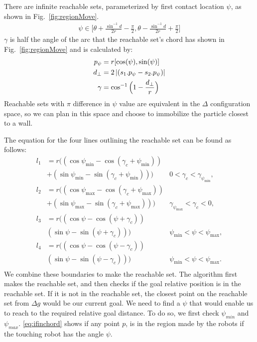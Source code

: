There are infinite reachable sets, parameterized by first contact location $\psi$, as shown in Fig.~\ref{fig:regionMove}.
\begin{align}
 \psi \in \Big[\theta +\frac{\sin^{-1}{d}}{2r} - \frac{\pi}{2}, \theta -\frac{\sin^{-1}{d}}{2r} + \frac{\pi}{2}\Big]
\end{align}
$\gamma$ is half the angle of the arc that the reachable set's chord has shown in Fig.~\ref{fig:regionMove} and is calculated by:
\begin{align}
p_\psi &= r[\cos(\psi ), \sin(\psi )]\\
d_\perp&= 2 \left\lvert(s_1.p_\psi - s_2.p_\psi)\right\rvert\\
\gamma &= \cos^{-1} \Big(1-\frac{d_\perp}{r} \Big)
\end{align}
Reachable sets with $\pi$ difference in $\psi$ value are equivalent in the  $\Delta$ configuration space, so we can plan in this space and choose to immobilize the particle closest to a wall. 

The equation for the four lines outlining the reachable set can be found as follows:
\begin{align}\label{eq:circlereachable}
l_1 &=  r \Big((\cos\psi_{\min}- \cos(\gamma_c + \psi_{\min}) )\\ \nonumber
& + (\sin\psi_{\min}- \sin(\gamma_c + \psi_{\min}))\Big) &  0<\gamma_c< \gamma_{\psi_{\min}},\\ \nonumber
l_2 &=  r \Big((\cos\psi_{\max}- \cos(\gamma_c + \psi_{\max}))\\ \nonumber
& + (\sin\psi_{\max}- \sin(\gamma_c + \psi_{\max}))\Big) &  \gamma_{\psi_{\max}}<\gamma_c< 0,\\  \nonumber
l_3 &=  r \Big((\cos\psi- \cos( \psi+\gamma_c ) )\\ \nonumber
& ( \sin\psi-\sin( \psi+ \gamma_c))\Big) &  \psi_{\min}<\psi< \psi_{\max},\\ \nonumber
l_4 &=  r \Big((\cos\psi- \cos( \psi-\gamma_c ))\\ \nonumber
&  ( \sin\psi- \sin( \psi- \gamma_c))\Big) &  \psi_{\min}<\psi< \psi_{\max}.\\ \nonumber
\end{align}
We combine these boundaries to make the reachable set. 
The algorithm first makes the reachable set, and then checks if the goal relative position is in the reachable set. If it is not in the reachable set, the closest point on the reachable set from $\Delta g$ would be our current goal. We need to find a $\psi$ that would enable us to reach to the required relative goal distance. To do so, we first check $\psi_{min}$ and $\psi_{max}$. \eqref{eq:ifinchord} shows if any point $p$, is in the region made by the robots if the touching robot has the angle $\psi$.

